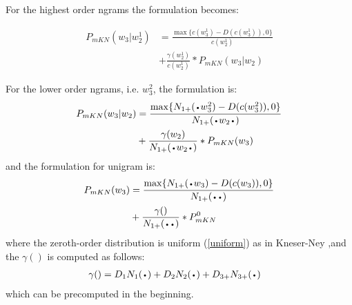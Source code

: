 \documentclass[11pt]{article}
\newcommand*{\LargerCdot}{\raisebox{-0.75ex}{\scalebox{2}{$\cdot$}}}
\begin{document}
For the highest order ngrams the formulation becomes:

\begin{align}\label{highestordermkn}
 P_{mKN}(w_3|w^{1}_{2}) &= \frac{\max\{c(w^{1}_{3}) - D(c(w^{1}_{3})),0\}}{c(w^{1}_{2})}\\\nonumber
 &+ \frac{\gamma(w^{1}_{2})}{c(w^{1}_{2})}*P_{mKN}(w_3|w_2)
\end{align}

For the lower order ngrams, i.e. $w^{2}_{3}$, the formulation is:
\begin{align}\label{midordermkn}
\nonumber P_{mKN}(w_3|w_2) &= \frac{\max\{N_{1+}(\LargerCdot w^{2}_{3}) - D(c(w^{2}_{3})),0\}}{N_{1+}(\LargerCdot w_2 \LargerCdot)}\\ 
&+ \frac{\gamma(w_2)}{N_{1+}(\LargerCdot w_2 \LargerCdot)}*P_{mKN}(w_3)
\end{align}
and the formulation for unigram is:
\begin{align}\label{lowestordermkn}
\nonumber P_{mKN}(w_3) &= \frac{\max\{N_{1+}(\LargerCdot w_3) - D(c(w_3)),0\}}{N_{1+}(\LargerCdot \LargerCdot)} \\
&+ \frac{\gamma( )}{N_{1+}(\LargerCdot \LargerCdot)}*P_{mKN}^{0}
\end{align}
where the zeroth-order distribution is uniform (\ref{uniform}) as in Kneser-Ney ,and the $\gamma( )$ is computed as follows:
\begin{align}\label{unigramgamma}
\gamma() &= D_1N_1(\LargerCdot) + D_2N_2(\LargerCdot) + D_{3+}N_{3+}(\LargerCdot)
\end{align}
which can be precomputed in the beginning.
\end{document}
